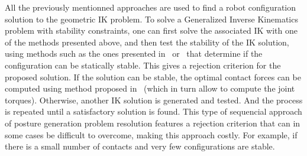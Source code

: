 All the previously mentionned approaches are used to find a robot configuration solution to the geometric IK problem.
To solve a Generalized Inverse Kinematics problem with stability constraints, one can first solve the associated IK with one of the methods presented above, and then test the stability of the IK solution, using methods such as the ones presented in~\cite{bretl:itro:2008} or~\cite{rimon2008general} that determine if the configuration can be statically stable.
This gives a rejection criterion for the proposed solution.
If the solution can be stable, the optimal contact forces can be computed using method proposed in~\cite{boyd2007fast} (which in turn allow to compute the joint torques).
Otherwise, another IK solution is generated and tested.
And the process is repeated until a satisfactory solution is found.
This type of sequencial approach of posture generation problem resolution features a rejection criterion that can in some cases be difficult to overcome, making this approach costly.
For example, if there is a small number of contacts and very few configurations are stable.


